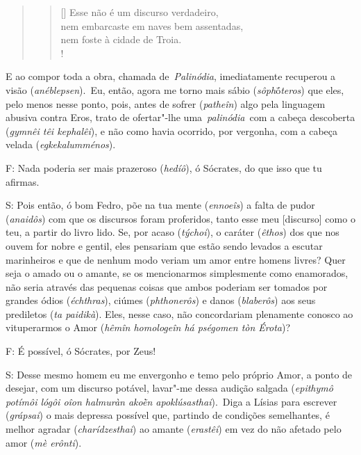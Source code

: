 \begin{quote}

\begin{verse}[\versewidth]
Esse não é um discurso verdadeiro,\\
 nem embarcaste em naves bem
assentadas,\\
 nem foste à cidade de Troia.\\!
\end{verse} 
\end{quote}

\bekker{[243b]} E ao compor toda a obra, chamada de~\emph{Palinódia},
imediatamente recuperou a visão (\emph{anéblepsen}).~Eu, então, agora me
torno mais sábio (\emph{sôph}ṓ\emph{teros}) que eles, pelo menos nesse
ponto, pois, antes de sofrer (\emph{patheîn}) algo pela linguagem
abusiva contra Eros, trato de ofertar"-lhe uma~\emph{palinódia}~com a
cabeça descoberta (\emph{gymnêi têi kephalêi}), e não como havia
ocorrido, por vergonha, com a cabeça velada (\emph{egkekalumménos}).

F: Nada poderia ser mais prazeroso (\emph{hedíô}), ó Sócrates, do que
isso que tu afirmas.

\bekker{[243c]} S: Pois então, ó bom Fedro, põe na tua mente (\emph{ennoeîs})
a falta de pudor (\emph{anaidôs}) com que os discursos foram proferidos,
tanto esse meu [discurso] como o teu, a partir do livro lido. Se,
por acaso (\emph{týchoi}), o caráter (\emph{êthos}) dos que nos ouvem
for nobre e gentil, eles pensariam que estão sendo levados a escutar
marinheiros e que de nenhum modo veriam um amor entre homens livres?
Quer seja o amado ou o amante, se os mencionarmos simplesmente como
enamorados, não seria através das pequenas coisas que ambos poderiam ser
tomados por grandes ódios (\emph{échthras}), ciúmes (\emph{phthonerôs})
e danos (\emph{blaberôs}) aos seus prediletos (\emph{ta paidikà}).
\bekker{[243d]} Eles, nesse caso, não concordariam plenamente conosco ao
vituperarmos o Amor (\emph{hêmîn homologeîn há pségomen tòn Érota})?

F: É possível, ó Sócrates, por Zeus!

S: Desse mesmo homem eu me envergonho e temo pelo próprio Amor, a ponto
de desejar, com um discurso potável, lavar"-me dessa audição salgada
(\emph{epithymô potímôi lógôi oîon halmuràn akoḕn apoklúsasthai}).~Diga
a Lísias para escrever (\emph{grápsai}) o mais depressa possível que,
partindo de condições semelhantes, é melhor agradar
(\emph{charídzesthai}) ao amante (\emph{erastêi}) em vez do não afetado
pelo amor (\emph{mè erônti}).


